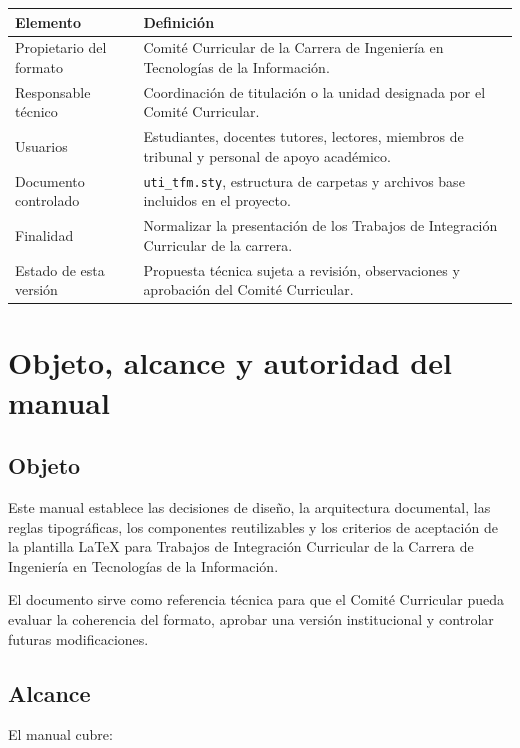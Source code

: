 \documentclass[12pt,a4paper,oneside]{report}
\begin{document}
\begin{longtable}{|p{3.8cm}|p{8.8cm}|}
  \hline
  \textbf{Elemento} & \textbf{Definición} \\
  \hline
  Propietario del formato & Comité Curricular de la Carrera de Ingeniería en Tecnologías de la Información. \\
  \hline
  Responsable técnico & Coordinación de titulación o la unidad designada por el Comité Curricular. \\
  \hline
  Usuarios & Estudiantes, docentes tutores, lectores, miembros de tribunal y personal de apoyo académico. \\
  \hline
  Documento controlado & \texttt{uti\_tfm.sty}, estructura de carpetas y archivos base incluidos en el proyecto. \\
  \hline
  Finalidad & Normalizar la presentación de los Trabajos de Integración Curricular de la carrera. \\
  \hline
  Estado de esta versión & Propuesta técnica sujeta a revisión, observaciones y aprobación del Comité Curricular. \\
  \hline
\end{longtable}

\tableofcontents
\clearpage
{}

\chapter{Objeto, alcance y autoridad del manual}

\section{Objeto}

Este manual establece las decisiones de diseño, la arquitectura documental, las reglas tipográficas, los componentes reutilizables y los criterios de aceptación de la plantilla LaTeX para Trabajos de Integración Curricular de la Carrera de Ingeniería en Tecnologías de la Información.

El documento sirve como referencia técnica para que el Comité Curricular pueda evaluar la coherencia del formato, aprobar una versión institucional y controlar futuras modificaciones.

\section{Alcance}

El manual cubre:
\end{document}
